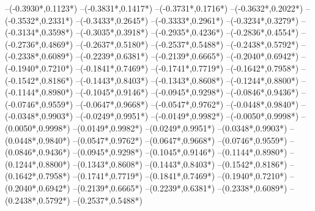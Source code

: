 {	--({-0.3930*\xskala},{0.1123*\yskala})
	--({-0.3831*\xskala},{0.1417*\yskala})
	--({-0.3731*\xskala},{0.1716*\yskala})
	--({-0.3632*\xskala},{0.2022*\yskala})
	--({-0.3532*\xskala},{0.2331*\yskala})
	--({-0.3433*\xskala},{0.2645*\yskala})
	--({-0.3333*\xskala},{0.2961*\yskala})
	--({-0.3234*\xskala},{0.3279*\yskala})
	--({-0.3134*\xskala},{0.3598*\yskala})
	--({-0.3035*\xskala},{0.3918*\yskala})
	--({-0.2935*\xskala},{0.4236*\yskala})
	--({-0.2836*\xskala},{0.4554*\yskala})
	--({-0.2736*\xskala},{0.4869*\yskala})
	--({-0.2637*\xskala},{0.5180*\yskala})
	--({-0.2537*\xskala},{0.5488*\yskala})
	--({-0.2438*\xskala},{0.5792*\yskala})
	--({-0.2338*\xskala},{0.6089*\yskala})
	--({-0.2239*\xskala},{0.6381*\yskala})
	--({-0.2139*\xskala},{0.6665*\yskala})
	--({-0.2040*\xskala},{0.6942*\yskala})
	--({-0.1940*\xskala},{0.7210*\yskala})
	--({-0.1841*\xskala},{0.7469*\yskala})
	--({-0.1741*\xskala},{0.7719*\yskala})
	--({-0.1642*\xskala},{0.7958*\yskala})
	--({-0.1542*\xskala},{0.8186*\yskala})
	--({-0.1443*\xskala},{0.8403*\yskala})
	--({-0.1343*\xskala},{0.8608*\yskala})
	--({-0.1244*\xskala},{0.8800*\yskala})
	--({-0.1144*\xskala},{0.8980*\yskala})
	--({-0.1045*\xskala},{0.9146*\yskala})
	--({-0.0945*\xskala},{0.9298*\yskala})
	--({-0.0846*\xskala},{0.9436*\yskala})
	--({-0.0746*\xskala},{0.9559*\yskala})
	--({-0.0647*\xskala},{0.9668*\yskala})
	--({-0.0547*\xskala},{0.9762*\yskala})
	--({-0.0448*\xskala},{0.9840*\yskala})
	--({-0.0348*\xskala},{0.9903*\yskala})
	--({-0.0249*\xskala},{0.9951*\yskala})
	--({-0.0149*\xskala},{0.9982*\yskala})
	--({-0.0050*\xskala},{0.9998*\yskala})
	--({0.0050*\xskala},{0.9998*\yskala})
	--({0.0149*\xskala},{0.9982*\yskala})
	--({0.0249*\xskala},{0.9951*\yskala})
	--({0.0348*\xskala},{0.9903*\yskala})
	--({0.0448*\xskala},{0.9840*\yskala})
	--({0.0547*\xskala},{0.9762*\yskala})
	--({0.0647*\xskala},{0.9668*\yskala})
	--({0.0746*\xskala},{0.9559*\yskala})
	--({0.0846*\xskala},{0.9436*\yskala})
	--({0.0945*\xskala},{0.9298*\yskala})
	--({0.1045*\xskala},{0.9146*\yskala})
	--({0.1144*\xskala},{0.8980*\yskala})
	--({0.1244*\xskala},{0.8800*\yskala})
	--({0.1343*\xskala},{0.8608*\yskala})
	--({0.1443*\xskala},{0.8403*\yskala})
	--({0.1542*\xskala},{0.8186*\yskala})
	--({0.1642*\xskala},{0.7958*\yskala})
	--({0.1741*\xskala},{0.7719*\yskala})
	--({0.1841*\xskala},{0.7469*\yskala})
	--({0.1940*\xskala},{0.7210*\yskala})
	--({0.2040*\xskala},{0.6942*\yskala})
	--({0.2139*\xskala},{0.6665*\yskala})
	--({0.2239*\xskala},{0.6381*\yskala})
	--({0.2338*\xskala},{0.6089*\yskala})
	--({0.2438*\xskala},{0.5792*\yskala})
	--({0.2537*\xskala},{0.5488*\yskala})
}
